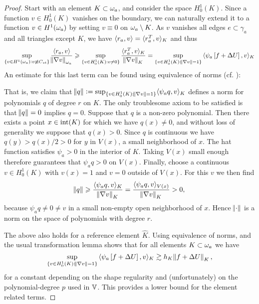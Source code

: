 \documentclass[thesis.tex]{subfiles}
\begin{document}
\begin{proof}
  Start with an element $K \subset \omega_a$, and consider the space $H_0^1(K)$. Since a function $v \in H_0^1(K)$ vanishes on the boundary, 
  we can naturally extend it to a function $v \in H^1(\omega_a)$ by setting $v \equiv 0$ on $\omega_a \setminus K$. As $v$
  vanishes all edges $e \subset \gamma_a$ and all triangles except $K$, we have $\langle r_a, v \rangle = \langle{r_a^T, v}\rangle_K$ and thus
  \[
    \sup_{\{v \in H^1(\omega_a) : v \not \equiv C_{st}\}} { \langle r_a, v \rangle \over \norm{\nabla v}_{\omega_a}} 
    \geqslant \sup_{\{v \in H_0^1(K) : v \ne 0\}} { \langle{r^T_a, v}\rangle_K \over \norm{\nabla v}_{K}}
    = \sup_{\{v \in H_0^1(K) :  \norm{\nabla v}=1\}} { \langle\psi_a\left[ f + \Delta U\right],v\rangle_K }
  \]
  An estimate for this last term can be found using equivalence of norms (cf. \cite[Ex~9.x.5]{brenner}):
  
  That is, we claim that $\norm{q} := \sup_{\{v \in H_0^1(K) : \norm{\nabla v}=1\}} \langle \psi_a q, v\rangle_K$
  defines a norm for polynomials $q$ of degree $r$ on $K$. The only troublesome axiom to be satisfied
  is that $\norm{q} = 0$  implies $q=0$. Suppose that $q$ is a non-zero polynomial.
  Then there exists a point $x \in \operatorname{int}(K)$ for which we have $q(x) \ne 0$, and without loss of generality we suppose that $q(x) > 0$.
  Since $q$ is continuous we have $q(y) > q(x) / 2 > 0$ for $y$ in $V(x)$, a small neighborhood of $x$.
  The hat function satisfies $\psi_a > 0$ in the interior of $K$. Taking $V(x)$ small enough therefore guarantees that $\psi_a q>0$ on $V(x)$.
  Finally, choose a continuous $v \in H_0^1(K)$  with $v(x) = 1$ and $v = 0$ outside of $V(x)$. For this $v$ we then find
  \[
    \norm{q} \geqslant { \langle  \psi_a q, v\rangle_K \over \norm{\nabla v}_K}  = {\langle \psi_a q, v\rangle_{V(x)} \over \norm{\nabla v}_K} > 0,
  \]
  because $\psi_a q \ne 0 \ne v$ in a small non-empty open neighborhood of $x$. Hence $\norm{\cdot}$ is a norm on the space of polynomials with degree $r$.
  
  The above also holds for a reference element $\hat K$. Using equivalence of norms, and the usual transformation lemma
  shows that for all elements $K \subset \omega_a$ we have
  \[
    \sup_{\{v \in H_0^1(K) :  \norm{\nabla v}=1\}} { \langle\psi_a\left[ f + \Delta U\right],v\rangle_K } \gtrsim h_K \norm{ f + \Delta U }_K,
  \]
  for a constant depending on the shape regularity and (unfortunately) on the polynomial-degree $p$ used in $\mathbb{V}$.  This
  provides a lower bound for the element related terms.
  

\end{proof}
\end{document}
